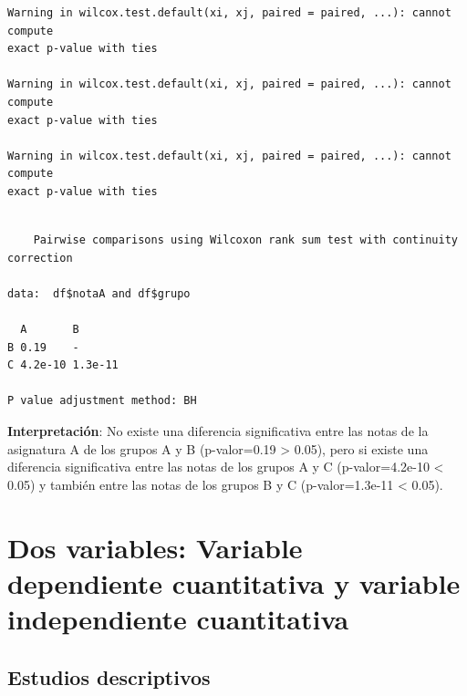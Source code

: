 \documentclass[
  a4paper,
]{scrreport}
\newenvironment{Shaded}{\begin{snugshade}}{\end{snugshade}}
\newcommand{\AttributeTok}[1]{\textcolor[rgb]{0.40,0.45,0.13}{#1}}
\newcommand{\CommentTok}[1]{\textcolor[rgb]{0.37,0.37,0.37}{#1}}
\newcommand{\FunctionTok}[1]{\textcolor[rgb]{0.28,0.35,0.67}{#1}}
\newcommand{\NormalTok}[1]{\textcolor[rgb]{0.00,0.23,0.31}{#1}}
\newcommand{\SpecialCharTok}[1]{\textcolor[rgb]{0.37,0.37,0.37}{#1}}
\newcommand{\StringTok}[1]{\textcolor[rgb]{0.13,0.47,0.30}{#1}}
\theoremstyle{definition}
\theoremstyle{definition}
\theoremstyle{remark}
\begin{document}
\begin{Shaded}
\end{Shaded}

\begin{verbatim}
Warning in wilcox.test.default(xi, xj, paired = paired, ...): cannot compute
exact p-value with ties

Warning in wilcox.test.default(xi, xj, paired = paired, ...): cannot compute
exact p-value with ties

Warning in wilcox.test.default(xi, xj, paired = paired, ...): cannot compute
exact p-value with ties
\end{verbatim}

\begin{verbatim}

    Pairwise comparisons using Wilcoxon rank sum test with continuity correction 

data:  df$notaA and df$grupo 

  A       B      
B 0.19    -      
C 4.2e-10 1.3e-11

P value adjustment method: BH 
\end{verbatim}

\textbf{Interpretación}: No existe una diferencia significativa entre
las notas de la asignatura A de los grupos A y B (p-valor=0.19
\textgreater{} 0.05), pero si existe una diferencia significativa entre
las notas de los grupos A y C (p-valor=4.2e-10 \textless{} 0.05) y
también entre las notas de los grupos B y C (p-valor=1.3e-11 \textless{}
0.05).

\section{Dos variables: Variable dependiente cuantitativa y variable
independiente
cuantitativa}\label{dos-variables-variable-dependiente-cuantitativa-y-variable-independiente-cuantitativa}

\subsection{Estudios descriptivos}\label{estudios-descriptivos-5}
\end{document}
